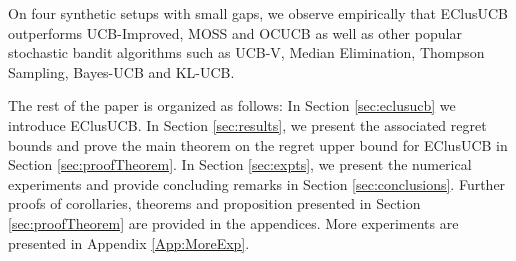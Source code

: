 On four synthetic setups with small gaps, we observe empirically that EClusUCB outperforms UCB-Improved\cite{auer2010ucb}, MOSS\cite{audibert2009minimax} and OCUCB\cite{lattimore2015optimally} as well as other popular stochastic bandit algorithms such as UCB-V\cite{audibert2009exploration}, Median Elimination\cite{even2006action}, Thompson Sampling\cite{agrawal2011analysis}, Bayes-UCB\cite{kaufmann2012bayesian} and KL-UCB\cite{garivier2011kl}. 

The rest of the paper is organized as follows: In Section \ref{sec:eclusucb} we introduce EClusUCB. In Section \ref{sec:results}, we present the associated regret bounds and prove the main theorem on the regret upper bound for EClusUCB in Section \ref{sec:proofTheorem}. In Section \ref{sec:expts}, we present the numerical experiments and provide concluding remarks in Section \ref{sec:conclusions}. Further proofs of corollaries, theorems and proposition presented in Section \ref{sec:proofTheorem} are provided in the appendices. More experiments are presented in Appendix \ref{App:MoreExp}. 
